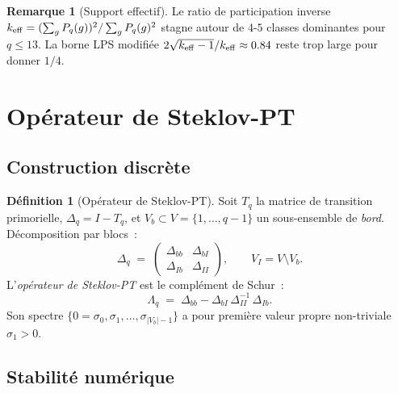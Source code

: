 \documentclass[11pt,a4paper]{article}
\theoremstyle{definition}
\newtheorem{definition}[theorem]{Définition}
\newtheorem{remark}[theorem]{Remarque}
\begin{document}
\begin{remark}[Support effectif]
Le ratio de participation inverse
$k_{\rm eff} = (\sum_g P_q(g))^2 / \sum_g P_q(g)^2$
stagne autour de $4$-$5$ classes dominantes pour $q\leq 13$. La borne
LPS modifiée $2\sqrt{k_{\rm eff}-1}/k_{\rm eff} \approx 0.84$ reste
trop large pour donner $1/4$.
\end{remark}

\section{Opérateur de Steklov-PT}
\label{sec:steklov}

\subsection{Construction discrète}

\begin{definition}[Opérateur de Steklov-PT]
\label{def:steklov_pt}
Soit $T_q$ la matrice de transition primorielle, $\Delta_q = I-T_q$,
et $V_b\subset V=\{1,\ldots,q-1\}$ un sous-ensemble de \emph{bord}.
Décomposition par blocs~:
\begin{equation}
  \Delta_q \;=\;
  \begin{pmatrix} \Delta_{bb} & \Delta_{bI} \\
  \Delta_{Ib} & \Delta_{II}\end{pmatrix},
  \qquad V_I = V\setminus V_b.
\end{equation}
L'\emph{opérateur de Steklov-PT} est le complément de Schur~:
\begin{equation}
  \boxed{\;
  \Lambda_q \;=\; \Delta_{bb} - \Delta_{bI}\,\Delta_{II}^{-1}\,\Delta_{Ib}.
  \;}
\end{equation}
Son spectre $\{0=\sigma_0,\sigma_1,\ldots,\sigma_{|V_b|-1}\}$ a pour
première valeur propre non-triviale $\sigma_1 > 0$.
\end{definition}

\subsection{Stabilité numérique}
\end{document}
